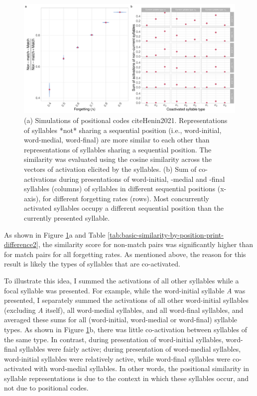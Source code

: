 \documentclass[
]{article}
\begin{document}
\begin{figure}
\includegraphics[width=1\linewidth]{tp_model_entrainment_files/figure-latex/basic-similarity-by-position-plot-difference-and-coactivation-1} \caption{(a) Simulations of positional codes cite{Henin2021}. Representations of syllables *not* sharing a sequential position (i.e., word-initial, word-medial, word-final) are more similar to each other than representations of syllables sharing a sequential position. The similarity was evaluated using the cosine similarity across the vectors of activation elicited by the syllables. (b) Sum of co-activations during presentations of word-initial, -medial and -final syllables (columns) of syllables in different sequential positions (x-axis), for different forgetting rates (rows). Most concurrently activated syllables occupy a different sequential position than the currently presented syllable.}\label{fig:basic-similarity-by-position-plot-difference-and-coactivation}
\end{figure}

As shown in Figure
\ref{fig:basic-similarity-by-position-plot-difference-and-coactivation}a
and Table \ref{tab:basic-similarity-by-position-print-difference2}, the
similarity score for non-match pairs was significantly higher than for
match pairs for all forgetting rates. As mentioned above, the reason for
this result is likely the types of syllables that are co-activated.

To illustrate this idea, I summed the activations of all other syllables
while a focal syllable was presented. For example, while the
word-initial syllable \emph{A} was presented, I separately summed the
activations of all other word-initial syllables (excluding \emph{A}
itself), all word-medial syllables, and all word-final syllables, and
averaged these sums for all (word-initial, word-medial or word-final)
syllable types. As shown in Figure
\ref{fig:basic-similarity-by-position-plot-difference-and-coactivation}b,
there was little co-activation between syllables of the same type. In
contrast, during presentation of word-initial syllables, word-final
syllables were fairly active; during presentation of word-medial
syllables, word-initial syllables were relatively active, while
word-final syllables were co-activated with word-medial syllables. In
other words, the positional similarity in syllable representations is
due to the context in which these syllables occur, and not due to
positional codes.
\end{document}
